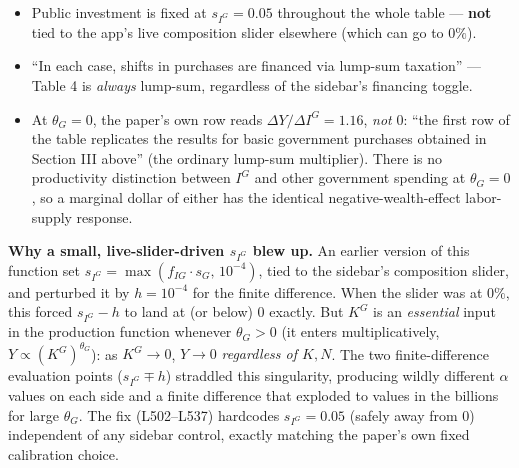 \documentclass[11pt]{article}
\begin{document}
\begin{itemize}
\item Public investment is fixed at $s_{I^G}=0.05$ throughout the whole
table --- \textbf{not} tied to the app's live composition slider elsewhere
(which can go to $0\%$).
\item ``In each case, shifts in purchases are financed via lump-sum
taxation'' --- Table 4 is \emph{always} lump-sum, regardless of the
sidebar's financing toggle.
\item At $\theta_G=0$, the paper's own row reads $\Delta Y/\Delta I^G=1.16$,
\emph{not} $0$: ``the first row of the table replicates the results for
basic government purchases obtained in Section III above'' (the ordinary
lump-sum multiplier). There is no productivity distinction between $I^G$
and other government spending at $\theta_G=0$, so a marginal dollar of
either has the identical negative-wealth-effect labor-supply response.
\end{itemize}

\begin{notebox}
\textbf{Why a small, live-slider-driven $s_{I^G}$ blew up.} An earlier
version of this function set $s_{I^G}=\max(f_{IG}\cdot s_G,\,10^{-4})$,
tied to the sidebar's composition slider, and perturbed it by
$h=10^{-4}$ for the finite difference. When the slider was at $0\%$, this
forced $s_{I^G}-h$ to land at (or below) $0$ exactly. But $K^G$ is an
\emph{essential} input in the production function whenever $\theta_G>0$
(it enters multiplicatively, $Y\propto(K^G)^{\theta_G}$): as $K^G\to0$,
$Y\to0$ \emph{regardless of $K,N$}. The two finite-difference evaluation
points ($s_{I^G}\mp h$) straddled this singularity, producing wildly
different $\alpha$ values on each side and a finite difference that
exploded to values in the billions for large $\theta_G$. The fix
(L502--L537) hardcodes $s_{I^G}=0.05$ (safely away from $0$) independent of
any sidebar control, exactly matching the paper's own fixed calibration
choice.
\end{notebox}
\end{document}
